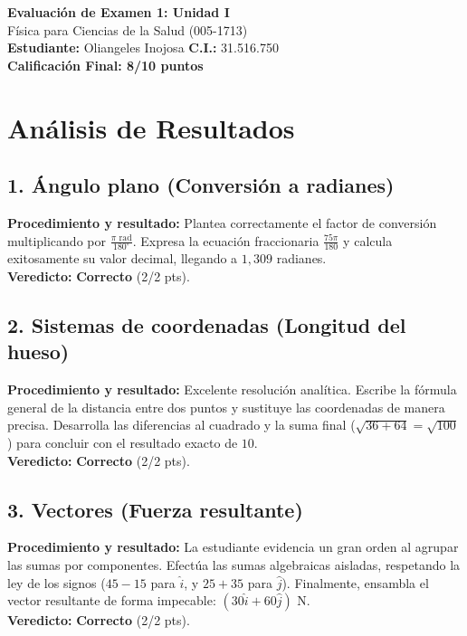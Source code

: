 \documentclass[12pt]{article}
\begin{document}
\begin{center}
    \Large \textbf{Evaluación de Examen 1: Unidad I} \\
    \large Física para Ciencias de la Salud (005-1713) \\
    \vspace{0.5cm}
    \textbf{Estudiante:} Oliangeles Inojosa \quad \textbf{C.I.:} 31.516.750
    \vspace{0.3cm} \\
    \large \textbf{Calificación Final: 8/10 puntos}
\end{center}

\vspace{0.5cm}

\section*{Análisis de Resultados}

\subsection*{1. Ángulo plano (Conversión a radianes)}
\textbf{Procedimiento y resultado:} Plantea correctamente el factor de conversión multiplicando por $\frac{\pi \text{ rad}}{180^\circ}$. Expresa la ecuación fraccionaria $\frac{75\pi}{180}$ y calcula exitosamente su valor decimal, llegando a $1,309$ radianes. \\
\textbf{Veredicto:} \textbf{Correcto} (2/2 pts).

\subsection*{2. Sistemas de coordenadas (Longitud del hueso)}
\textbf{Procedimiento y resultado:} Excelente resolución analítica. Escribe la fórmula general de la distancia entre dos puntos y sustituye las coordenadas de manera precisa. Desarrolla las diferencias al cuadrado y la suma final ($\sqrt{36+64} = \sqrt{100}$) para concluir con el resultado exacto de $10$. \\
\textbf{Veredicto:} \textbf{Correcto} (2/2 pts).

\subsection*{3. Vectores (Fuerza resultante)}
\textbf{Procedimiento y resultado:} La estudiante evidencia un gran orden al agrupar las sumas por componentes. Efectúa las sumas algebraicas aisladas, respetando la ley de los signos ($45-15$ para $\hat{i}$, y $25+35$ para $\hat{j}$). Finalmente, ensambla el vector resultante de forma impecable: $(30\hat{i} + 60\hat{j})$ N. \\
\textbf{Veredicto:} \textbf{Correcto} (2/2 pts).
\end{document}
